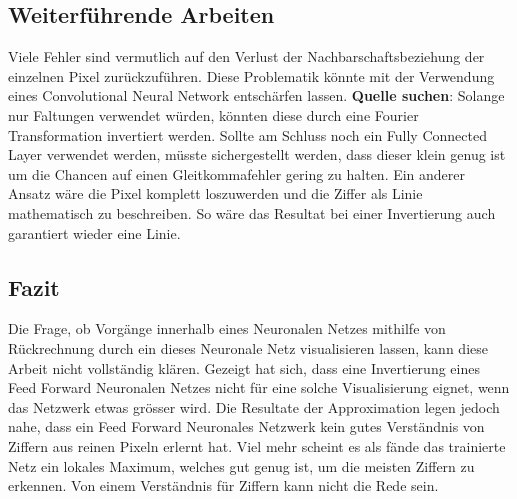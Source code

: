 \documentclass[Interploate_hadwritten_Digits.tex]{subfiles}
\begin{document}
	\subsection{Weiterführende Arbeiten}
	Viele Fehler sind vermutlich auf den Verlust der Nachbarschaftsbeziehung der einzelnen Pixel zurückzuführen. Diese Problematik könnte mit der Verwendung eines Convolutional Neural Network entschärfen lassen. \textbf{Quelle suchen}: Solange nur Faltungen verwendet würden, könnten diese durch eine Fourier Transformation invertiert werden. Sollte am Schluss noch ein Fully Connected Layer verwendet werden, müsste sichergestellt werden, dass dieser klein genug ist um die Chancen auf einen Gleitkommafehler gering zu halten.
	Ein anderer Ansatz wäre die Pixel komplett loszuwerden und die Ziffer als Linie mathematisch zu beschreiben. So wäre das Resultat bei einer Invertierung auch garantiert wieder eine Linie.
	
	\subsection{Fazit}
	Die Frage, ob Vorgänge innerhalb eines Neuronalen Netzes mithilfe von Rückrechnung durch ein dieses Neuronale Netz visualisieren lassen, kann diese Arbeit nicht vollständig klären. Gezeigt hat sich, dass eine Invertierung eines Feed Forward Neuronalen Netzes nicht für eine solche Visualisierung eignet, wenn das Netzwerk etwas grösser wird. Die Resultate der Approximation legen jedoch nahe, dass ein Feed Forward Neuronales Netzwerk kein gutes Verständnis von Ziffern aus reinen Pixeln erlernt hat. Viel mehr scheint es als fände das trainierte Netz ein lokales Maximum, welches gut genug ist, um die meisten Ziffern zu erkennen. Von einem Verständnis für Ziffern kann nicht die Rede sein.
	
\end{document}
